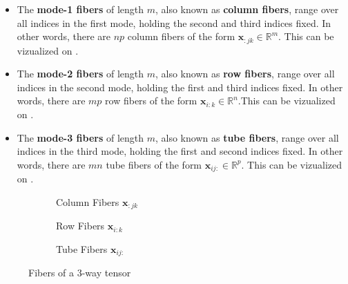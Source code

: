     \begin{itemize}
        \item The \textbf{mode-1 fibers} of length $m$, also known as
        \textbf{column fibers}, range over all indices in the first mode,
        holding the second and third indices fixed. In other words, there are
        $np$ column fibers of the form $\mathbf{x}_{:jk}\in\mathbb{R}^m$. This
        can be vizualized on .
        \item The \textbf{mode-2 fibers} of length $m$, also known as
        \textbf{row fibers}, range over all indices in the second mode,
        holding the first and third indices fixed. In other words, there are
        $mp$ row fibers of the form $\mathbf{x}_{i:k}\in\mathbb{R}^n$.This
        can be vizualized on .
        \item The \textbf{mode-3 fibers} of length $m$, also known as
        \textbf{tube fibers}, range over all indices in the third mode,
        holding the first and second indices fixed. In other words, there are
        $mn$ tube fibers of the form $\mathbf{x}_{ij:}\in\mathbb{R}^p$. This
        can be vizualized on .
    \end{itemize}

    \begin{figure}[ht]
        \def\m{2.5}
        \def\n{2}
        \def\p{1.5}
        \def\mslices{6}
        \def\nslices{5}
        \def\pslices{4}
        \def\rot{90}

        \centering
        
        \begin{subfigure}[b]{0.32\textwidth}
            \centering
            
            \caption[Column Fibers]{Column Fibers $\mathbf{x}_{:jk}$}
            \label{fig:column_fibers}
        \end{subfigure}
        \hfill
        \begin{subfigure}[b]{0.32\textwidth}
            \centering
            
            \caption[Row Fibers]{Row Fibers $\mathbf{x}_{i:k}$}
            \label{fig:row_fibers}
        \end{subfigure}
        \hfill
        \begin{subfigure}[b]{0.32\textwidth}
            \centering
            
            \caption[Tube Fibers]{Tube Fibers $\mathbf{x}_{ij:}$}
            \label{fig:tube_fibers}
        \end{subfigure}

        \caption{Fibers of a 3-way tensor}
        \label{fig:fibers}
    \end{figure}

